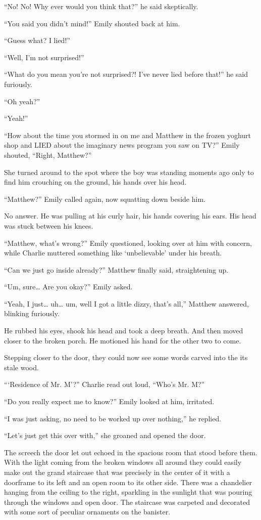 “No! No! Why ever would you think that?” he said skeptically.

“You said you didn't mind!” Emily shouted back at him.

“Guess what? I lied!”

“Well, I'm not surprised!”

“What do you mean you're not surprised?! I've never lied before that!” he said furiously.

“Oh yeah?”

“Yeah!”

“How about the time you stormed in on me and Matthew in the frozen yoghurt shop and LIED about the imaginary news program you saw on TV?” Emily shouted, “Right, Matthew?”

She turned around to the spot where the boy was standing moments ago only to find him crouching on the ground, his hands over his head.

“Matthew?” Emily called again, now squatting down beside him.

No answer. He was pulling at his curly hair, his hands covering his ears. His head was stuck between his knees.

“Matthew, what's wrong?” Emily questioned, looking over at him with concern, while Charlie muttered something like ‘unbelievable' under his breath.

“Can we just go inside already?” Matthew finally said, straightening up.

“Um, sure… Are you okay?” Emily asked.

“Yeah, I just… uh… um, well I got a little dizzy, that's all,” Matthew answered, blinking furiously.

He rubbed his eyes, shook his head and took a deep breath. And then moved closer to the broken porch. He motioned his hand for the other two to come.

Stepping closer to the door, they could now see some words carved into the its stale wood.

“‘Residence of Mr. M'?” Charlie read out loud, “Who's Mr. M?”

“Do you really expect me to know?” Emily looked at him, irritated.

“I was just asking, no need to be worked up over nothing,” he replied.

“Let's just get this over with,” she groaned and opened the door.

The screech the door let out echoed in the spacious room that stood before them. With the light coming from the broken windows all around they could easily make out the grand staircase that was precisely in the center of it with a doorframe to its left and an open room to its other side. There was a chandelier hanging from the ceiling to the right, sparkling in the sunlight that was pouring through the windows and open door. The staircase was carpeted and decorated with some sort of peculiar ornaments on the banister.

